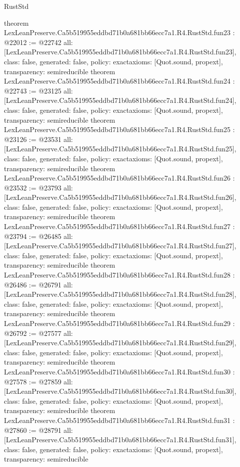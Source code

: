 \begin{lexlean}{RustStd}
\begin{coremodule}
{}
theorem LexLeanPreserve.Ca5b519955eddbd71b0a681bb66ecc7a1.R4.RustStd.fun23 : @22012 := @22742 {
  all: [LexLeanPreserve.Ca5b519955eddbd71b0a681bb66ecc7a1.R4.RustStd.fun23],
  class: false,
  generated: false,
  policy: exact{axioms: [Quot.sound, propext]},
  transparency: semireducible
}
theorem LexLeanPreserve.Ca5b519955eddbd71b0a681bb66ecc7a1.R4.RustStd.fun24 : @22743 := @23125 {
  all: [LexLeanPreserve.Ca5b519955eddbd71b0a681bb66ecc7a1.R4.RustStd.fun24],
  class: false,
  generated: false,
  policy: exact{axioms: [Quot.sound, propext]},
  transparency: semireducible
}
theorem LexLeanPreserve.Ca5b519955eddbd71b0a681bb66ecc7a1.R4.RustStd.fun25 : @23126 := @23531 {
  all: [LexLeanPreserve.Ca5b519955eddbd71b0a681bb66ecc7a1.R4.RustStd.fun25],
  class: false,
  generated: false,
  policy: exact{axioms: [Quot.sound, propext]},
  transparency: semireducible
}
theorem LexLeanPreserve.Ca5b519955eddbd71b0a681bb66ecc7a1.R4.RustStd.fun26 : @23532 := @23793 {
  all: [LexLeanPreserve.Ca5b519955eddbd71b0a681bb66ecc7a1.R4.RustStd.fun26],
  class: false,
  generated: false,
  policy: exact{axioms: [Quot.sound, propext]},
  transparency: semireducible
}
theorem LexLeanPreserve.Ca5b519955eddbd71b0a681bb66ecc7a1.R4.RustStd.fun27 : @23794 := @26485 {
  all: [LexLeanPreserve.Ca5b519955eddbd71b0a681bb66ecc7a1.R4.RustStd.fun27],
  class: false,
  generated: false,
  policy: exact{axioms: [Quot.sound, propext]},
  transparency: semireducible
}
theorem LexLeanPreserve.Ca5b519955eddbd71b0a681bb66ecc7a1.R4.RustStd.fun28 : @26486 := @26791 {
  all: [LexLeanPreserve.Ca5b519955eddbd71b0a681bb66ecc7a1.R4.RustStd.fun28],
  class: false,
  generated: false,
  policy: exact{axioms: [Quot.sound, propext]},
  transparency: semireducible
}
theorem LexLeanPreserve.Ca5b519955eddbd71b0a681bb66ecc7a1.R4.RustStd.fun29 : @26792 := @27577 {
  all: [LexLeanPreserve.Ca5b519955eddbd71b0a681bb66ecc7a1.R4.RustStd.fun29],
  class: false,
  generated: false,
  policy: exact{axioms: [Quot.sound, propext]},
  transparency: semireducible
}
theorem LexLeanPreserve.Ca5b519955eddbd71b0a681bb66ecc7a1.R4.RustStd.fun30 : @27578 := @27859 {
  all: [LexLeanPreserve.Ca5b519955eddbd71b0a681bb66ecc7a1.R4.RustStd.fun30],
  class: false,
  generated: false,
  policy: exact{axioms: [Quot.sound, propext]},
  transparency: semireducible
}
theorem LexLeanPreserve.Ca5b519955eddbd71b0a681bb66ecc7a1.R4.RustStd.fun31 : @27860 := @28791 {
  all: [LexLeanPreserve.Ca5b519955eddbd71b0a681bb66ecc7a1.R4.RustStd.fun31],
  class: false,
  generated: false,
  policy: exact{axioms: [Quot.sound, propext]},
  transparency: semireducible
}
\end{coremodule}
\end{lexlean}
